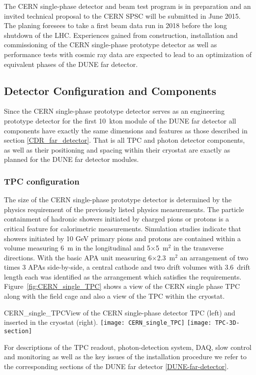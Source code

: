 The CERN single-phase detector and beam test program is in preparation and an invited technical proposal 
\cite{CERN_single-phase_proposal} to the CERN SPSC will be submitted in June 2015. The planing foresees to 
take a first beam data run in 2018 before the long shutdown of the LHC. Experiences gained from construction, installation and commissioning of the CERN single-phase prototype detector as well as performance tests with 
cosmic ray data are expected to lead to an optimization of equivalent phases of the DUNE far detector. 

\subsection{Detector Configuration and Components}

Since the CERN single-phase prototype detector serves as an engineering prototype detector for the 
first 10~kton module of the DUNE far detector all components have exactly the same dimensions
and features as those described in section \ref{CDR_far_detector}. That is all TPC and photon detector components, 
as well as their positioning and spacing within their cryostat are exactly as planned for the DUNE far detector modules.

\subsubsection{TPC configuration}

The size of the CERN single-phase prototype detector is determined by the physics requirement of the previously 
listed physics measurements. The particle containment of hadronic showers initiated by charged pions or protons
is a critical feature for calorimetric measurements. Simulation studies indicate that showers initiated by 10 GeV
primary pions and protons are contained within a volume measuring 6~m in the longitudinal and 5$\times$5~m$^2$
in the transverse directions. With the basic APA unit measuring 6$\times$2.3~m$^2$ an arrangement of two times 
3 APAs  side-by-side, a central cathode and two drift volumes with 3.6~drift length each was identified as the arrangement which satisfies the requirements. Figure~\ref{fig:CERN_single_TPC} shows a view of the CERN single phase TPC along with the field cage and also a view of the TPC within the cryostat.
%
\begin{cdrfigure}{CERN_single_TPC}{View of the CERN single-phase detector TPC (left) and inserted in the cryostat (right). }
\texttt{[image: CERN\_single\_TPC]}
\texttt{[image: TPC-3D-section]}
\end{cdrfigure}
%
For descriptions of the TPC readout, photon-detection system, DAQ, slow control and monitoring as well as 
the key issues of the installation procedure we refer to the corresponding sections of the DUNE far 
detector \ref{DUNE-far-detector}.

